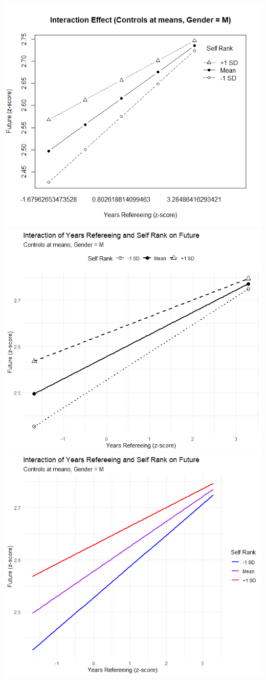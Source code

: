 \documentclass{article}
\begin{document}
\includegraphics[]{PS6a_Canova.png}
\includegraphics[]{PS6b_Canova.png}
\includegraphics[]{PS6c_Canova.png}
\end{document}

